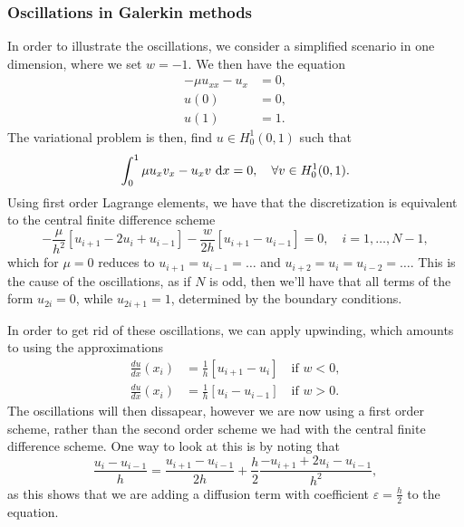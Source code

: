 \subsubsection{Oscillations in Galerkin methods}
In order to illustrate the oscillations, we consider a simplified scenario in one dimension, where we set $w = -1$.
We then have the equation
\begin{equation}
    \begin{split}
        -\mu u_{xx} - u_x &= 0, \\
        u(0) &= 0, \\
        u(1) &= 1.
    \end{split}
\end{equation}
The variational problem is then, find $u \in H^1_0(0, 1)$ such that
\begin{equation}
    \int_{0}^{1} \mu u_x v_x - u_x v \, \mathop{}\!\mathrm{d} x = 0, \quad \forall v \in H^1_0(0, 1).
\end{equation}
Using first order Lagrange elements, we have that the discretization is equivalent to the central finite difference scheme
\begin{equation}
    -\frac{\mu}{h^2} \left[
        u_{i+1} - 2u_i + u_{i-1}
    \right]
    - \frac{w}{2h} \left[
        u_{i+1} - u_{i-1}
    \right] = 0, \quad i = 1, \ldots, N-1,
\end{equation}
which for $\mu = 0$ reduces to $u_{i + 1} = u_{i - 1} = \ldots$ and $u_{i + 2} = u_i = u_{i - 2} = \ldots$.
This is the cause of the oscillations, as if $N$ is odd, then we'll have that all terms of the form $u_{2i} = 0$, while $u_{2i + 1} = 1$, determined by the boundary conditions.

In order to get rid of these oscillations, we can apply upwinding, which amounts to using the approximations
\begin{equation}
    \begin{split}
        \frac{du}{dx}(x_i) &= \frac{1}{h} \left[
            u_{i+1} - u_{i}
        \right] \quad \text{if } w < 0, \\
        \frac{du}{dx}(x_i) &= \frac{1}{h} \left[
            u_{i} - u_{i-1}
        \right] \quad \text{if } w > 0.
    \end{split}
\end{equation}
The oscillations will then dissapear, however we are now using a first order scheme, rather than the second order scheme we had with the central finite difference scheme.
One way to look at this is by noting that
\begin{equation}
    \frac{u_i - u_{i-1}}{h} = \frac{u_{i + 1} - u_{i - 1}}{2h} + \frac{h}{2} \frac{-u_{i + 1} + 2u_i - u_{i - 1}}{h^2},
\end{equation}
as this shows that we are adding a diffusion term with coefficient $\varepsilon = \frac{h}{2}$ to the equation.

